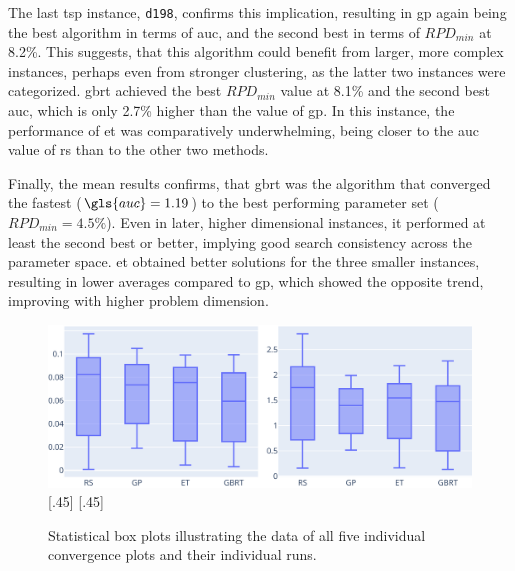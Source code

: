 The last \gls{tsp} instance, \texttt{d198}, confirms this implication, resulting in \gls{gp} again being the best algorithm in terms of \gls{auc}, and the second best in terms of $RPD_{min}$ at 8.2\%. This suggests, that this algorithm could benefit from larger, more complex instances, perhaps even from stronger clustering, as the latter two instances were categorized. \gls{gbrt} achieved the best $RPD_{min}$ value at 8.1\% and the second best \gls{auc}, which is only 2.7\% higher than the value of \gls{gp}. In this instance, the performance of \gls{et} was comparatively underwhelming, being closer to the \gls{auc} value of \gls{rs} than to the other two methods.

Finally, the mean results confirms, that \gls{gbrt} was the algorithm that converged the fastest ($\gls{auc} = 1.19$) to the best performing parameter set ($RPD_{min} = 4.5\%$). Even in later, higher dimensional  instances, it performed at least the second best or better, implying good search consistency across the parameter space. \gls{et} obtained better solutions for the three smaller instances, resulting in lower averages compared to \gls{gp}, which showed the opposite trend, improving with higher problem dimension.

\begin{figure}[h]
	\centering
	\includegraphics[width=\textwidth]{results/part1/convergence_stats_boxplot.svg}
\captionsetup[subfigure]
{skip=-8pt}
		\hfill
		[.45\linewidth]{\hfill}
		\hfill
		[.45\linewidth]{\hfill}

	\caption[Statistical box plots illustrating convergence plots]{Statistical box plots illustrating the data of all five individual convergence plots and their individual runs.}
\label{fig:convergence_stats_boxplots}
\end{figure}

